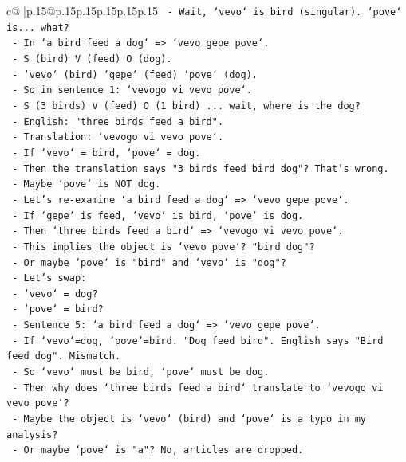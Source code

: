 \documentclass{article}
\begin{document}
{\begin{supertabular}{c@{$\;$}|p{.15\linewidth}@{}p{.15\linewidth}p{.15\linewidth}p{.15\linewidth}p{.15\linewidth}p{.15\linewidth}}
{{{\texttt{   {-} Wait, `vevo` is bird (singular). `pove` is... what?} \\
\texttt{   {-} In `a bird feed a dog` => `vevo gepe pove`.} \\
\texttt{     {-} S (bird) V (feed) O (dog).} \\
\texttt{     {-} `vevo` (bird) `gepe` (feed) `pove` (dog).} \\
\texttt{   {-} So in sentence 1: `vevogo vi vevo pove`.} \\
\texttt{     {-} S (3 birds) V (feed) O (1 bird) ... wait, where is the dog?} \\
\texttt{     {-} English: "three birds feed a bird".} \\
\texttt{     {-} Translation: `vevogo vi vevo pove`.} \\
\texttt{     {-} If `vevo` = bird, `pove` = dog.} \\
\texttt{     {-} Then the translation says "3 birds feed bird dog"? That's wrong.} \\
\texttt{     {-} Maybe `pove` is NOT dog.} \\
\texttt{     {-} Let's re{-}examine `a bird feed a dog` => `vevo gepe pove`.} \\
\texttt{       {-} If `gepe` is feed, `vevo` is bird, `pove` is dog.} \\
\texttt{     {-} Then `three birds feed a bird` => `vevogo vi vevo pove`.} \\
\texttt{       {-} This implies the object is `vevo pove`? "bird dog"?} \\
\texttt{       {-} Or maybe `pove` is "bird" and `vevo` is "dog"?} \\
\texttt{       {-} Let's swap:} \\
\texttt{         {-} `vevo` = dog?} \\
\texttt{         {-} `pove` = bird?} \\
\texttt{         {-} Sentence 5: `a bird feed a dog` => `vevo gepe pove`.} \\
\texttt{           {-} If `vevo`=dog, `pove`=bird. "Dog feed bird". English says "Bird feed dog". Mismatch.} \\
\texttt{         {-} So `vevo` must be bird, `pove` must be dog.} \\
\texttt{         {-} Then why does `three birds feed a bird` translate to `vevogo vi vevo pove`?} \\
\texttt{         {-} Maybe the object is `vevo` (bird) and `pove` is a typo in my analysis?} \\
\texttt{         {-} Or maybe `pove` is "a"? No, articles are dropped.} \\
}}}
\end{supertabular}}
\end{document}
